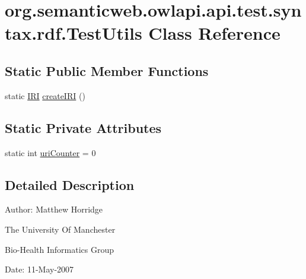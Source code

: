 \hypertarget{classorg_1_1semanticweb_1_1owlapi_1_1api_1_1test_1_1syntax_1_1rdf_1_1_test_utils}{\section{org.\-semanticweb.\-owlapi.\-api.\-test.\-syntax.\-rdf.\-Test\-Utils Class Reference}
\label{classorg_1_1semanticweb_1_1owlapi_1_1api_1_1test_1_1syntax_1_1rdf_1_1_test_utils}
}
\subsection*{Static Public Member Functions}
\begin{DoxyCompactItemize}
\item 
static \hyperlink{classorg_1_1semanticweb_1_1owlapi_1_1model_1_1_i_r_i}{I\-R\-I} \hyperlink{classorg_1_1semanticweb_1_1owlapi_1_1api_1_1test_1_1syntax_1_1rdf_1_1_test_utils_a3df4410760b8a71c39ef187eb012d05f}{create\-I\-R\-I} ()
\end{DoxyCompactItemize}
\subsection*{Static Private Attributes}
\begin{DoxyCompactItemize}
\item 
static int \hyperlink{classorg_1_1semanticweb_1_1owlapi_1_1api_1_1test_1_1syntax_1_1rdf_1_1_test_utils_a158173934b925f0fa323e633b7289ec8}{uri\-Counter} = 0
\end{DoxyCompactItemize}


\subsection{Detailed Description}
Author\-: Matthew Horridge\par
 The University Of Manchester\par
 Bio-\/\-Health Informatics Group\par
 Date\-: 11-\/\-May-\/2007\par
 \par
 

